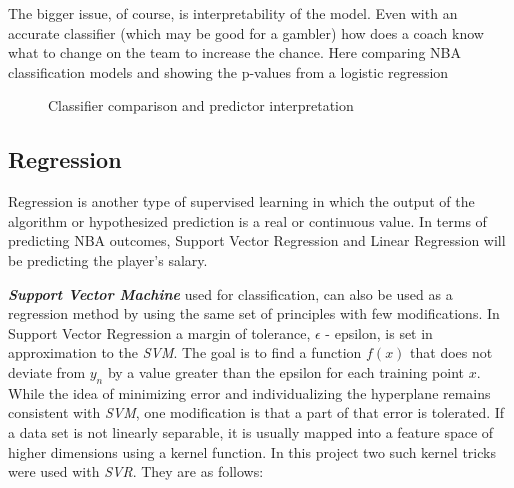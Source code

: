 \documentclass{article}
\begin{document}
The bigger issue, of course, is interpretability of the model. 
Even with an accurate classifier (which may be good for a gambler)
how does a coach know what to change on the team to increase the chance.
Here comparing NBA classification models and showing the p-values from a logistic regression
\begin{figure}[H]
    \centering
    \qquad
    \caption{Classifier comparison and predictor interpretation}%
\end{figure}

\subsection{Regression} 
Regression is another type of supervised learning in which the output of the algorithm or hypothesized prediction is a real or continuous value. In terms of predicting NBA outcomes, Support Vector Regression and Linear Regression will be predicting the player's salary. 

\textbf{\textit{Support Vector Machine}} used for classification, can also be used as a regression method by using the same set of principles with few modifications.
In Support Vector Regression a margin of tolerance, $\epsilon$ - epsilon, is set in approximation to the \textit{SVM}.
The goal is to find a function $f(x)$ that does not deviate from $y_n$ by a value greater than the epsilon for each training point $x$.
While the idea of minimizing error and individualizing the hyperplane remains consistent with \textit{SVM}, one modification is that a part of that error is tolerated.
If a data set is not linearly separable, it is usually mapped into a feature space of higher dimensions using a kernel function.
In this project two such kernel tricks were used with \textit{SVR}. They are as follows:
\end{document}
